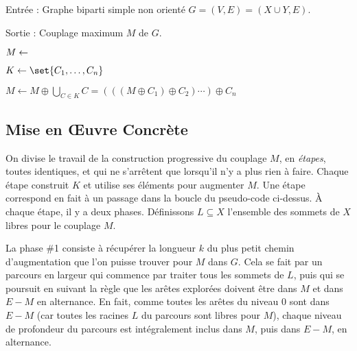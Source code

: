     Entrée : Graphe biparti simple non orienté $G = (V,E) = (X \cup Y, E)$.
    
    Sortie : Couplage maximum $M$ de $G$.
    \bigskip
    
    $M \leftarrow \empty$

    
    
    \hspace{2em} $K \leftarrow \set{C_1,\dots,C_n}$
    
        
    \hspace{2em} 
    
    \hspace{2em} 
    
    \hspace{2em}  
    
    \hspace{2em} $ M \leftarrow M \oplus \bigcup_{C \in K} C = (((M \oplus C_1) \oplus C_2) \cdots ) \oplus C_n$
    
     
    
 \SEP
 
  \subsection{Mise en Œuvre Concrète}
 
 On divise le travail de la construction progressive du couplage $M$, en \emph{étapes}, toutes identiques, et qui ne s'arrêtent que lorsqu'il n'y a plus rien à faire. Chaque étape construit $K$ et utilise ses éléments pour augmenter $M$. Une étape correspond en fait à un passage dans la boucle  du pseudo-code ci-dessus. À chaque étape, il y a deux phases. Définissons $L \subseteq X$ l'ensemble des sommets de $X$ libres pour le couplage $M$.
 
 La phase \#1 consiste à récupérer la longueur $k$ du plus petit chemin d'augmentation que l'on puisse trouver pour $M$ dans $G$. Cela se fait par un parcours en largeur qui commence par traiter tous les sommets de $L$, puis qui se poursuit en suivant la règle que les arêtes explorées doivent être dans $M$ et dans $E \minus M$ en alternance. En fait, comme toutes les arêtes du niveau $0$ sont dans $E\minus M$ (car toutes les racines $L$ du parcours sont libres pour $M$), chaque niveau de profondeur du parcours est intégralement inclus dans $M$, puis dans $E \minus M$, en alternance.
 
